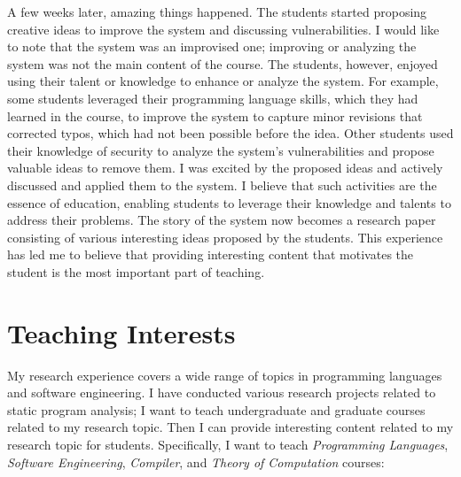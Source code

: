 \documentclass[11pt]{article}
\begin{document}
A few weeks later, amazing things happened. The students started proposing creative ideas to improve the system and discussing vulnerabilities. I would like to note that the system was an improvised one; improving or analyzing the system was not the main content of the course. The students, however, enjoyed using their talent or knowledge to enhance or analyze the system. For example, some students leveraged their programming language skills, which they had learned in the course, to improve the system to capture minor revisions that corrected typos, which had not been possible before the idea.
Other students used their knowledge of security to analyze the system's vulnerabilities and propose valuable ideas to remove them. I was excited by the proposed ideas and actively discussed and applied them to the system.
I believe that such activities are the essence of education, enabling students to leverage their knowledge and talents to address their problems.
The story of the system now becomes a research paper consisting of various interesting ideas proposed by the students.
This experience has led me to believe that providing interesting content that motivates the student is the most important part of teaching.











\section{Teaching Interests}
My research experience covers a wide range of topics in programming languages and software engineering.
I have conducted various research projects related to static program analysis; I want to teach undergraduate and graduate courses related to my research topic. Then I can provide interesting content related to my research topic for students.
Specifically, I want to teach {\it Programming Languages}, {\it Software Engineering}, {\it Compiler}, and {\it Theory of Computation} courses:
\end{document}
